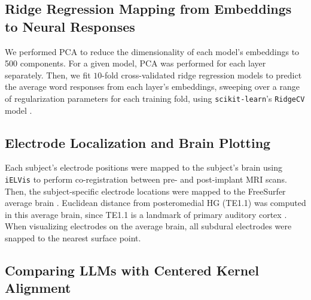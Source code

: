 



\subsection{Ridge Regression Mapping from Embeddings to Neural Responses}

We performed PCA to reduce the dimensionality of each model's embeddings to 500 components. For a given model, PCA was performed for each layer separately. Then, we fit $10$-fold cross-validated ridge regression models to predict the average word responses from each layer's embeddings, sweeping over a range of regularization parameters for each training fold, using \texttt{scikit-learn}'s \texttt{RidgeCV} model \cite{pedregosa2011scikit}.



\subsection{Electrode Localization and Brain Plotting}

Each subject's electrode positions were mapped to the subject's brain using \texttt{iELVis} \cite{groppe2017ielvis} to perform co-registration between pre- and post-implant MRI scans. Then, the subject-specific electrode locations were mapped to the FreeSurfer average brain \cite{fischl2004automatically}. Euclidean distance from posteromedial HG (TE1.1) \cite{morosan2001human} was computed in this average brain, since TE1.1 is a landmark of primary auditory cortex \cite{baumann2013unified, norman2022multiscale, norman2018neural, mischler2023deep}. When visualizing electrodes on the average brain, all subdural electrodes were snapped to the nearest surface point.

\subsection{Comparing LLMs with Centered Kernel Alignment}

